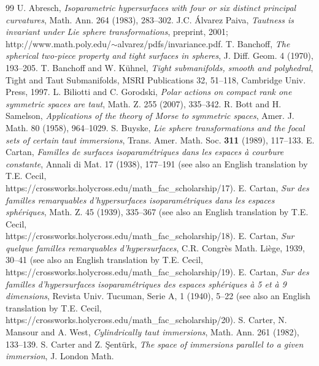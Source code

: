 \documentclass[12pt]{article}
\begin{document}
{\begin{thebibliography}{99}
U. Abresch, {\em Isoparametric hypersurfaces with
four or six distinct principal curvatures}, Math. Ann. 264 (1983),
283--302.
 J.C. \'{A}lvarez Paiva, {\em Tautness is invariant under Lie
sphere transformations}, preprint, 2001;\\
http://www.math.poly.edu/$\sim$alvarez/pdfs/invariance.pdf.
T. Banchoff, {\em The spherical two-piece property and
tight surfaces in spheres}, J. Diff. Geom. 4 (1970), 193--205.
T. Banchoff and W. K\"{u}hnel, {\em Tight submanifolds,
smooth and polyhedral}, Tight and Taut Submanifolds, MSRI
Publications 32, 51--118, Cambridge Univ. Press, 1997.
 L. Biliotti and C. Gorodski, {\em Polar actions on compact rank one symmetric spaces are taut}, Math. Z. 255 (2007), 335--342. 
R. Bott and H. Samelson, {\em Applications of the
theory of Morse to symmetric spaces}, Amer. J. Math. 80 (1958),
964--1029.
 S. Buyske, {\em Lie sphere transformations and the
focal sets of certain taut immersions}, Trans. Amer. Math.
Soc. {\bf 311} (1989), 117--133.
  E. Cartan, {\em Familles de surfaces 
isoparam\'{e}triques dans les espaces \`{a} courbure constante},
Annali di Mat. 17 (1938), 177--191 (see also an English translation by T.E. Cecil, \\
https://crossworks.holycross.edu/math\_fac\_scholarship/17).
  E. Cartan,
{\em Sur des familles remarquables d'hypersurfaces
isoparam\'{e}triques dans les espaces sph\'{e}riques},
Math. Z. 45 (1939), 335--367 (see also an English translation by T.E. Cecil, \\
https://crossworks.holycross.edu/math\_fac\_scholarship/18).
  E. Cartan,
{\em Sur quelque familles remarquables d'hypersurfaces}, 
C.R. Congr\`{e}s Math. Li\`{e}ge, 1939, 30--41 (see also an English translation by T.E. Cecil, 
https://crossworks.holycross.edu/math\_fac\_scholarship/19).
 E. Cartan, {\em Sur des 
familles d'hypersurfaces isoparam\'{e}triques des espaces 
sph\'{e}riques \`{a} 5 et \`{a} 9 dimensions}, Revista Univ. Tucuman, Serie A, 1 (1940), 5--22
(see also an English translation by T.E. Cecil, \\
https://crossworks.holycross.edu/math\_fac\_scholarship/20).
 S. Carter, N. Mansour and A. West, {\em Cylindrically
taut immersions}, Math. Ann. 261 (1982), 133--139.
 S. Carter and Z. \c{S}ent\"{u}rk, {\em The space of
immersions parallel to a given immersion}, J. London Math.

\end{thebibliography}}
\end{document}
